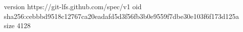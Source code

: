 version https://git-lfs.github.com/spec/v1
oid sha256:cebbbd9518c12767ca20eadafd5d3f56fb3b0e9559f7dbe30e103f6f173d125a
size 4128
